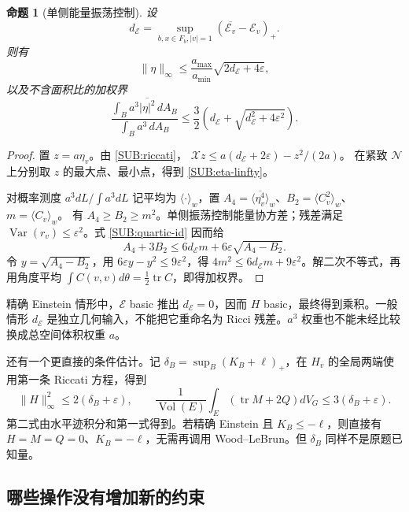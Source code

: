 \documentclass[UTF8,fontset=fandol,zihao=-4,oneside,openany]{ctexbook}
\theoremstyle{cjkplain}
\newtheorem{proposition}[theorem]{命题}
\numberwithin{equation}{chapter}
\begin{document}
\begin{proposition}[单侧能量振荡控制]\label{SUB:oscillation}
设
\[
d_{\mathcal E}=\sup_{b,x\in F_b,|v|=1}
(\overline{\mathcal E_v}-\mathcal E_v)_+.
\]
则有
\begin{equation}\label{SUB:eta-linfty}
\|\eta\|_\infty
\le\frac{a_{\max}}{a_{\min}}\sqrt{2d_{\mathcal E}+4\varepsilon},
\end{equation}
以及不含面积比的加权界
\begin{equation}\label{SUB:eta-weighted}
\frac{\int_Ba^3\overline{|\eta|^2}\,dA_B}{\int_Ba^3\,dA_B}
\le\frac32\left(d_{\mathcal E}+\sqrt{d_{\mathcal E}^2+4\varepsilon^2}\right).
\end{equation}
\end{proposition}
\begin{proof}
置 $z=a\eta_v$。由 \eqref{SUB:riccati}，
$\mathcal Xz\le a(d_{\mathcal E}+2\varepsilon)-z^2/(2a)$。
在紧致 $\mathcal N$ 上分别取 $z$ 的最大点、最小点，得到 \eqref{SUB:eta-linfty}。

对概率测度 $a^3dL/\int a^3dL$ 记平均为 $\langle\cdot\rangle_w$，置
$A_4=\langle\overline{\eta_v^4}\rangle_w$、$B_2=\langle C_v^2\rangle_w$、$m=\langle C_v\rangle_w$。
有 $A_4\ge B_2\ge m^2$。单侧振荡控制能量协方差；残差满足 $\operatorname{Var}(r_v)\le\varepsilon^2$。式 \eqref{SUB:quartic-id} 因而给
\[
A_4+3B_2\le6d_{\mathcal E}m+6\varepsilon\sqrt{A_4-B_2}.
\]
令 $y=\sqrt{A_4-B_2}$，用 $6\varepsilon y-y^2\le9\varepsilon^2$，得
$4m^2\le6d_{\mathcal E}m+9\varepsilon^2$。解二次不等式，再用角度平均
$\int C(v,v)d\theta=\tfrac12\operatorname{tr}C$，即得加权界。
\end{proof}

精确 Einstein 情形中，$\mathcal E$ basic 推出 $d_{\mathcal E}=0$，因而 $H$ basic，最终得到乘积。一般情形 $d_{\mathcal E}$ 是独立几何输入，不能把它重命名为 Ricci 残差。$a^3$ 权重也不能未经比较换成总空间体积权重 $a$。

还有一个更直接的条件估计。记
$\delta_B=\sup_B(K_B+\ell)_+$，在 $H_v$ 的全局两端使用第一条 Riccati 方程，得到
\begin{equation}\label{SUB:base-curvature-control}
\|H\|_\infty^2\le2(\delta_B+\varepsilon),\qquad
\frac1{\operatorname{Vol}(E)}\int_E(\operatorname{tr}M+2Q)dV_G
\le3(\delta_B+\varepsilon).
\end{equation}
第二式由水平迹积分和第一式得到。若精确 Einstein 且 $K_B\le-\ell$，则直接有 $H=M=Q=0$、$K_B=-\ell$，无需再调用 Wood--LeBrun。但 $\delta_B$ 同样不是原题已知量。

\subsection{哪些操作没有增加新的约束}
\end{document}
